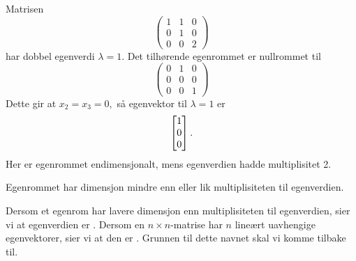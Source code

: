 \begin{ex}
Matrisen
\[
\begin{pmatrix}
1 & 1 & 0\\  0 &1 & 0 \\ 0 & 0 & 2
\end{pmatrix}
\]
har dobbel egenverdi $\lambda=1$. Det tilhørende egenrommet er nullrommet til 
\[
\begin{pmatrix}
0 & 1 & 0\\  0 &0 & 0 \\ 0 & 0 & 1
\end{pmatrix}
\]
%
Dette gir at
$
x_2=x_3=0,
$
så egenvektor til $\lambda=1$ er
\[
 \begin{bmatrix} 1 \\ 0 \\ 0 \end{bmatrix}.
\]
Her er egenrommet endimensjonalt, mens egenverdien hadde multiplisitet 2.
\end{ex}


\begin{thm}
Egenrommet har dimensjon mindre enn eller lik multiplisiteten til egenverdien. 
\end{thm}

\noindent Dersom et egenrom har lavere dimensjon enn multiplisiteten til egenverdien, sier vi at egenverdien er . 
Dersom en $n\times n$-matrise har $n$ lineært uavhengige egenvektorer, sier vi at den er .
Grunnen til dette navnet skal vi komme tilbake til.





\kapittelslutt
